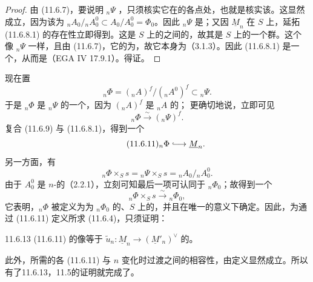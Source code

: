 \begin{proof}
由 (11.6.7)，要说明 ${}_n\Psi$ ，只须核实它在的各点处，也就是核实该。这显然成立，因为该为 ${}_nA_0/{}_nA_0^0\subset A_0/A_0^0=\Phi_0$。因此 ${}_n\Psi$ 是；又因 $\underline M_n$ 在 $S$ 上，延拓 (11.6.8.1) 的存在性立即得到。这是 $S$ 上的之间的，故其是 $S$ 上的一个群。这个像 ${}_n\Psi$ 一样，且由 (11.6.7)，它的为，故它本身为（3.1.3）。因此 (11.6.8.1) 是一个，从而是（EGA IV 17.9.1）。得证。
\end{proof}
现在置
\begin{equation}\tag{11.6.9}
 {}_n\Phi=({}_nA)^f/({}_nA^0)^f\subset{}_n\Psi.
\end{equation}
于是 ${}_n\Phi$ 是 ${}_n\Psi$ 的一个，因为 $({}_nA)^f$ 是 ${}_nA$ 的；
更确切地说，立即可见
\begin{equation}\tag{11.6.10}
 {}_n\Phi\xrightarrow{\sim}({}_n\Psi)^f.
\end{equation}
复合 (11.6.9) 与 (11.6.8.1)，得到一个
\begin{equation}\tag{11.6.11}
 {}_n\Phi\lhook\joinrel\longrightarrow\underline M_n.
\end{equation}
另一方面，有
\[
 {}_n\Phi\times_Ss={}_n\Psi\times_Ss={}_nA_0/{}_nA_0^0.
\]
由于 $A_0^0$ 是 $n$-的（2.2.1），立刻可知最后一项可认同于 ${}_n\Phi_0$；故得到一个
\begin{equation}\tag{11.6.12}
 {}_n\Phi\times_Ss\xrightarrow{\sim}{}_n\Phi_0,
\end{equation}
它表明，${}_n\Phi$ 被定义为为 ${}_n\Phi_0$ 的、$S$ 上的，并且在唯一的意义下确定。因此，为通过 (11.6.11) 定义所求 (11.6.4)，只须证明：
\begin{SGAresult}{}{11.6.13}
 (11.6.11) 的像等于 $\widetilde u_n:\underline M_n\longrightarrow(\underline M'_n)^\vee$ 的。
\end{SGAresult}
此外，所需的各 (11.6.11) 与 $n$ 变化时过渡之间的相容性，由定义显然成立。所以有了11.6.13，11.5的证明就完成了。


